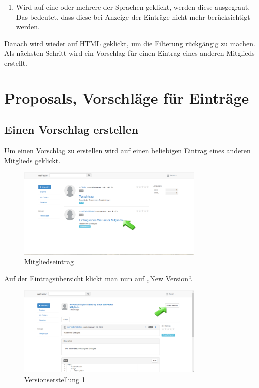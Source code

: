 \begin{enumerate}
\item Wird auf eine oder mehrere der Sprachen geklickt, werden diese ausgegraut. Das bedeutet, dass diese bei Anzeige der Einträge nicht mehr berücksichtigt werden.
\end{enumerate}


Danach wird wieder auf HTML geklickt, um die Filterung rückgängig zu machen.
Als nächsten Schritt wird ein Vorschlag für einen Eintrag eines anderen Mitglieds erstellt.


 
\chapter{Proposals, Vorschläge für Einträge}
\section{Einen Vorschlag erstellen}
Um einen Vorschlag zu erstellen wird auf einen beliebigen Eintrag eines anderen Mitglieds geklickt.

\begin{figure}[H]
    \centering
    \includegraphics[width=0.8\textwidth]{Bilder/28.png}
    \caption{Mitgliedseintrag}
    \label{fig:Mitgliedseintrag}
\end{figure}


Auf der Eintragsübersicht klickt man nun auf „New Version“.

\begin{figure}[H]
    \centering
    \includegraphics[width=0.8\textwidth]{Bilder/29.png}
    \caption{Versionserstellung 1}
    \label{fig:versionserstellung1}
\end{figure}


